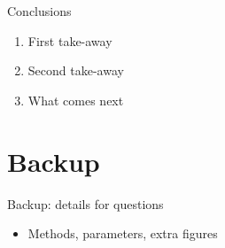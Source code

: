 \documentclass[aspectratio=169]{beamer}
\begin{document}
\begin{frame}{Conclusions}
	\begin{enumerate}
		\item First take-away
		\item Second take-away
		\item What comes next
	\end{enumerate}
\end{frame}

\appendix
\section*{Backup}

\begin{frame}[noframenumbering]{Backup: details for questions}
	\begin{itemize}
		\item Methods, parameters, extra figures
	\end{itemize}
\end{frame}
\end{document}
